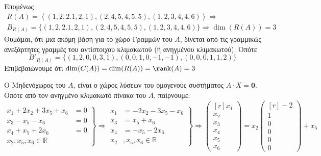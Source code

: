 \begin{myitemize}[leftmargin=*]
    Επομένως 
    \begin{gather*}
      R(A) = \left<(1,2,2.1,2,1), (2,4,5,4,5,5), (1,2,3,4,4,6) \right> \Rightarrow \\
      B_{R(A)} = \{ (1,2,2.1,2,1), (2,4,5,4,5,5), (1,2,3,4,4,6) \} \Rightarrow 
      \dim(R(A)) = 3
    \end{gather*} 
    Θυμάμαι, ότι μια ακόμη βάση για το χώρο Γραμμών του $A$, δίνεται από τις 
    γραμμικώς ανεξάρτητες γραμμές του αντίστοιχου κλιμακωτού (ή ανηγμένου κλιμακωτού).
    Οπότε 
    \[
      B'_{R(A)} = \{ (1,2,0,0,3,1), (0,0,1,0,-1,-1), (0,0,0,1,1,2) \}  
    \] 
    Επιβεβαιώνουμε ότι $ \dim(C(A)) = \dim(R(A)) = \rank(A) = 3 $
  \item Ο \textcolor{Col1}{Μηδενόχωρος} του $A$, είναι ο χώρος λύσεων του ομογενούς 
    συστήματος $ A \cdot X = \mathbf{0} $. Οπότε από τον ανηγμένο κλιμακωτό πίνακα του 
    $A$, παίρνουμε:
    \[
      \left.
        \begin{aligned}
          x_{1}+2 x_{2}+ 3 x_{5}+ x_{6}&= 0 \\
          x_{3}- x_{5}- x_{6}&= 0 \\
          x_{4}+ x_{5}+2 x_{6}&= 0 \\
          x_{2}, x_{5}, x_{6} \in \mathbb{R} 
        \end{aligned} 
      \right\}\!\! \Rightarrow 
      \left.
        \begin{aligned}
          x_{1} &= -2 x_{2} - 3 x_{5}- x_{6} \\
          x_{3} &= x_{5}+ x_{6} \\
          x_{4} &= - x_{5}- 2 x_{6} \\
          x_{2} &, x_{5}, x_{6} \in \mathbb{R} 
        \end{aligned} 
      \right\}\!\!\Rightarrow 
      \begin{pmatrix*}[r] 
        x_{1} \\ x_{2} \\ x_{3} \\ x_{4} \\ x_{5} \\ x_{6}  
      \end{pmatrix*} = x_{2} 
      \begin{pmatrix*}[r] -2 \\ 1 \\ 0 \\ 0 \\ 0 \\ 0 \end{pmatrix*} 
      + x_{5} 
\]
\end{myitemize}

